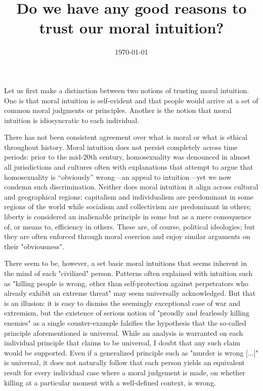 \documentclass{scrartcl}
\title{Do we have any good reasons to trust our moral intuition?}
\author{\today}
\date{}
\begin{document}
\maketitle


Let us first make a distinction between two notions of trusting moral intuition. One is that moral intuition is self-evident and that people would arrive at a set of common moral judgments or principles. Another is the notion that moral intuition is idiosyncratic to each individual.

There has not been consistent agreement over what is moral or what is ethical throughout history. Moral intuition does not persist completely across time periods: prior to the mid-20th century, homosexuality was denounced in almost all jurisdictions and cultures often with explanations that attempt to argue that homosexuality is ``obviously'' wrong---an appeal to intuition---yet we now condemn such discrimination. Neither does moral intuition it align across cultural and geographical regions: capitalism and individualism are predominant in some regions of the world while socialism and collectivism are predominant in others; liberty is considered an inalienable principle in some but as a mere consequence of, or means to, efficiency in others. These are, of course, political ideologies; but they are often enforced through moral coercion and enjoy similar arguments on their "obviousness".

There seem to be, however, a set basic moral intuitions that seems inherent in the mind of each "civilized" person. Patterns often explained with intuition such as "killing people is wrong, other than self-protection against perpetrators who already exhibit an extreme threat" may seem universally acknowledged. But that is an illusion: it is easy to dismiss the seemingly exceptional case of war and extremism, but the existence of serious notion of "proudly and fearlessly killing enemies" as a single counter-example falsifies the hypothesis that the so-called principle aforementioned is universal. While an analysis is warranted on each individual principle that claims to be universal, I doubt that any such claim would be supported.%
Even if a generalized principle such as "murder is wrong [...]" is universal, it does not naturally follow that each person yields an equivalent result for every individual case where a moral judgement is made, on whether killing at a particular moment with a well-defined context, is wrong.
\end{document}
